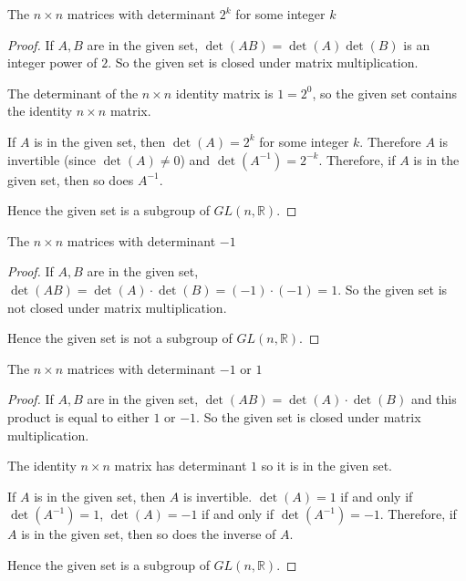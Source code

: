\begin{exercise}
    The $n\times n$ matrices with determinant $2^{k}$ for some integer $k$
\end{exercise}

\begin{proof}
    If $A, B$ are in the given set, $\det(AB) = \det(A)\det(B)$ is an integer power of $2$. So the given set is closed under matrix multiplication.

    The determinant of the $n\times n$ identity matrix is $1 = 2^{0}$, so the given set contains the identity $n\times n$ matrix.

    If $A$ is in the given set, then $\det(A) = 2^{k}$ for some integer $k$. Therefore $A$ is invertible (since $\det(A)\ne 0$) and $\det(A^{-1}) = 2^{-k}$. Therefore, if $A$ is in the given set, then so does $A^{-1}$.

    Hence the given set is a subgroup of $GL(n, \mathbb{R})$.
\end{proof}

\begin{exercise}
    The $n\times n$ matrices with determinant $-1$
\end{exercise}

\begin{proof}
    If $A, B$ are in the given set, $\det(AB) = \det(A)\cdot\det(B) = (-1)\cdot (-1) = 1$. So the given set is not closed under matrix multiplication.

    Hence the given set is not a subgroup of $GL(n, \mathbb{R})$.
\end{proof}

\begin{exercise}
    The $n\times n$ matrices with determinant $-1$ or $1$
\end{exercise}

\begin{proof}
    If $A, B$ are in the given set, $\det(AB) = \det(A)\cdot\det(B)$ and this product is equal to either $1$ or $-1$. So the given set is closed under matrix multiplication.

    The identity $n\times n$ matrix has determinant $1$ so it is in the given set.

    If $A$ is in the given set, then $A$ is invertible. $\det(A) = 1$ if and only if $\det(A^{-1}) = 1$, $\det(A) = -1$ if and only if $\det(A^{-1}) = -1$. Therefore, if $A$ is in the given set, then so does the inverse of $A$.

    Hence the given set is a subgroup of $GL(n, \mathbb{R})$.
\end{proof}

